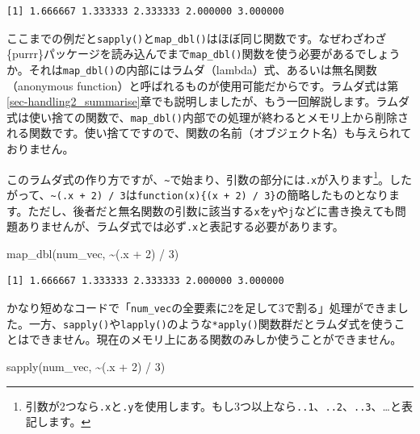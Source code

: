 \documentclass[
  a4paper,
  pandoc,
  ja=standard,
  jafont=haranoaji]{bxjsbook}
\newenvironment{Shaded}{\begin{snugshade}}{\end{snugshade}}
\newcommand{\DecValTok}[1]{\textcolor[rgb]{0.68,0.00,0.00}{#1}}
\newcommand{\FunctionTok}[1]{\textcolor[rgb]{0.28,0.35,0.67}{#1}}
\newcommand{\NormalTok}[1]{\textcolor[rgb]{0.00,0.48,0.65}{#1}}
\newcommand{\SpecialCharTok}[1]{\textcolor[rgb]{0.37,0.37,0.37}{#1}}
\begin{document}
\begin{verbatim}
[1] 1.666667 1.333333 2.333333 2.000000 3.000000
\end{verbatim}

ここまでの例だと\texttt{sapply()}と\texttt{map\_dbl()}はほぼ同じ関数です。なぜわざわざ\{purrr\}パッケージを読み込んでまで\texttt{map\_dbl()}関数を使う必要があるでしょうか。それは\texttt{map\_dbl()}の内部にはラムダ（lambda）式、あるいは無名関数（anonymous
function）と呼ばれるものが使用可能だからです。ラムダ式は第\ref{sec-handling2_summarise}章でも説明しましたが、もう一回解説します。ラムダ式は使い捨ての関数で、\texttt{map\_dbl()}内部での処理が終わるとメモリ上から削除される関数です。使い捨てですので、関数の名前（オブジェクト名）も与えられておりません。

このラムダ式の作り方ですが、\texttt{\textasciitilde{}}で始まり、引数の部分には\texttt{.x}が入ります\footnote{引数が2つなら\texttt{.x}と\texttt{.y}を使用します。もし3つ以上なら\texttt{..1}、\texttt{..2}、\texttt{..3}、\ldots と表記します。}。したがって、\texttt{\textasciitilde{}(.x\ +\ 2)\ /\ 3}は\texttt{function(x)\{(x\ +\ 2)\ /\ 3\}}の簡略したものとなります。ただし、後者だと無名関数の引数に該当する\texttt{x}を\texttt{y}や\texttt{j}などに書き換えても問題ありませんが、ラムダ式では必ず\texttt{.x}と表記する必要があります。

\begin{Shaded}
\begin{Highlighting}[numbers=left,,]
\FunctionTok{map\_dbl}\NormalTok{(num\_vec, }\SpecialCharTok{\textasciitilde{}}\NormalTok{(.x }\SpecialCharTok{+} \DecValTok{2}\NormalTok{) }\SpecialCharTok{/} \DecValTok{3}\NormalTok{)}
\end{Highlighting}
\end{Shaded}

\begin{verbatim}
[1] 1.666667 1.333333 2.333333 2.000000 3.000000
\end{verbatim}

かなり短めなコードで「\texttt{num\_vec}の全要素に2を足して3で割る」処理ができました。一方、\texttt{sapply()}や\texttt{lapply()}のような\texttt{*apply()}関数群だとラムダ式を使うことはできません。現在のメモリ上にある関数のみしか使うことができません。

\begin{Shaded}
\begin{Highlighting}[numbers=left,,]
\FunctionTok{sapply}\NormalTok{(num\_vec, }\SpecialCharTok{\textasciitilde{}}\NormalTok{(.x }\SpecialCharTok{+} \DecValTok{2}\NormalTok{) }\SpecialCharTok{/} \DecValTok{3}\NormalTok{)}
\end{Highlighting}
\end{Shaded}
\end{document}
